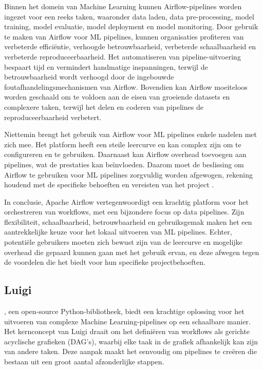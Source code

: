 Binnen het domein van Machine Learning kunnen Airflow-pipelines worden ingezet voor een reeks taken, waaronder data laden, data pre-processing, model training, model evaluatie, model deployment en model monitoring. Door gebruik te maken van Airflow voor ML pipelines, kunnen organisaties profiteren van verbeterde efficiëntie, verhoogde betrouwbaarheid, verbeterde schaalbaarheid en verbeterde reproduceerbaarheid. Het automatiseren van pipeline-uitvoering bespaart tijd en vermindert handmatige inspanningen, terwijl de betrouwbaarheid wordt verhoogd door de ingebouwde foutafhandelingsmechanismen van Airflow. Bovendien kan Airflow moeiteloos worden geschaald om te voldoen aan de eisen van groeiende datasets en complexere taken, terwijl het delen en coderen van pipelines de reproduceerbaarheid verbetert.

Niettemin brengt het gebruik van Airflow voor ML pipelines enkele nadelen met zich mee. Het platform heeft een steile leercurve en kan complex zijn om te configureren en te gebruiken. Daarnaast kan Airflow overhead toevoegen aan pipelines, wat de prestaties kan beïnvloeden. Daarom moet de beslissing om Airflow te gebruiken voor ML pipelines zorgvuldig worden afgewogen, rekening houdend met de specifieke behoeften en vereisten van het project \autocite{Harenslak2021}.

In conclusie, Apache Airflow vertegenwoordigt een krachtig platform voor het orchestreren van workflows, met een bijzondere focus op data pipelines. Zijn flexibiliteit, schaalbaarheid, betrouwbaarheid en gebruiksgemak maken het een aantrekkelijke keuze voor het lokaal uitvoeren van ML pipelines. Echter, potentiële gebruikers moeten zich bewust zijn van de leercurve en mogelijke overhead die gepaard kunnen gaan met het gebruik ervan, en deze afwegen tegen de voordelen die het biedt voor hun specifieke projectbehoeften.

\subsection{Luigi}

\textcite{Luigi2024}, een open-source Python-bibliotheek, biedt een krachtige oplossing voor het uitvoeren van complexe Machine Learning-pipelines op een schaalbare manier. Het kernconcept van Luigi draait om het definiëren van workflows als gerichte acyclische grafieken (DAG's), waarbij elke taak in de grafiek afhankelijk kan zijn van andere taken. Deze aanpak maakt het eenvoudig om pipelines te creëren die bestaan uit een groot aantal afzonderlijke stappen.

